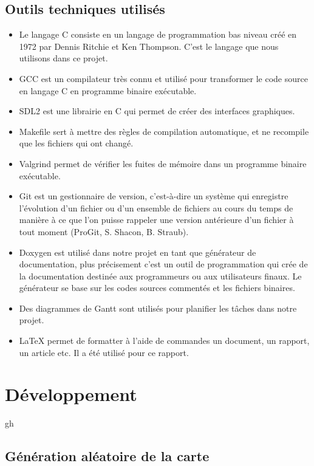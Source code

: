 \documentclass[11pt,a4paper]{article}
\begin{document}
\subsection{Outils techniques utilisés}

\begin{itemize}
\item Le langage C consiste en un langage de programmation bas niveau créé en 1972 par Dennis Ritchie et Ken Thompson. C'est le langage que nous utilisons dans ce projet.
\item GCC est un compilateur très connu et utilisé pour transformer le code source en langage C en programme binaire exécutable.
\item SDL2 est une librairie en C qui permet de créer des interfaces graphiques.
\item Makefile sert à mettre des règles de compilation automatique, et ne recompile que les fichiers qui ont changé.
\item Valgrind permet de vérifier les fuites de mémoire dans un programme binaire exécutable.
\item Git est un gestionnaire de version, c'est-à-dire un système qui enregistre l'évolution d'un fichier ou d'un ensemble de fichiers au cours du temps de manière à ce que l'on puisse rappeler une version antérieure d'un fichier à tout moment (ProGit, S. Shacon, B. Straub).
\item Doxygen est utilisé dans notre projet en tant que générateur de documentation, plus précisement c'est un outil de programmation qui crée de la documentation destinée aux programmeurs ou aux utilisateurs finaux. Le générateur se base sur les codes sources commentés et les fichiers binaires.
\item Des diagrammes de Gantt sont utilisés pour planifier les tâches dans notre projet.
\item LaTeX permet de formatter à l'aide de commandes un document, un rapport, un article etc. Il a été utilisé pour ce rapport.
\end{itemize}

\section{Développement}

gh

\subsection{Génération aléatoire de la carte}
\end{document}

